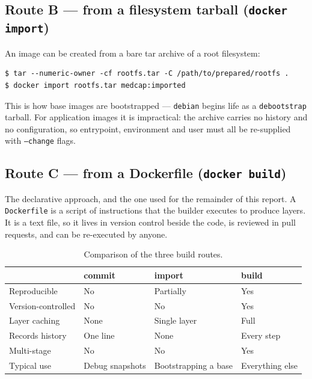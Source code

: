 \documentclass[10pt,a4paper]{article}
\newcommand{\cmd}[1]{\texttt{\small #1}}
\begin{document}
\subsection{Route B --- from a filesystem tarball (\cmd{docker import})}

An image can be created from a bare tar archive of a root filesystem:

\begin{lstlisting}[style=shell]
$ tar --numeric-owner -cf rootfs.tar -C /path/to/prepared/rootfs .
$ docker import rootfs.tar medcap:imported
\end{lstlisting}

This is how base images are bootstrapped --- \texttt{debian} begins life as
a \texttt{debootstrap} tarball. For application images it is impractical:
the archive carries no history and no configuration, so entrypoint,
environment and user must all be re-supplied with \cmd{--change} flags.

\subsection{Route C --- from a Dockerfile (\cmd{docker build})}

The declarative approach, and the one used for the remainder of this
report. A \texttt{Dockerfile} is a script of instructions that the
builder executes to produce layers. It is a text file, so it lives in
version control beside the code, is reviewed in pull requests, and can
be re-executed by anyone.

\begin{table}[htbp]
\centering
\caption{Comparison of the three build routes.}
\label{tab:routes}
\footnotesize
\begin{tabularx}{\linewidth}{@{}l X X X@{}}
\toprule
 & \textbf{commit} & \textbf{import} & \textbf{build} \\
\midrule
Reproducible      & No                 & Partially       & Yes \\
Version-controlled& No                 & No              & Yes \\
Layer caching     & None               & Single layer    & Full \\
Records history   & One line           & None            & Every step \\
Multi-stage       & No                 & No              & Yes \\
Typical use       & Debug snapshots    & Bootstrapping a base & Everything else \\
\bottomrule
\end{tabularx}
\end{table}
\end{document}
